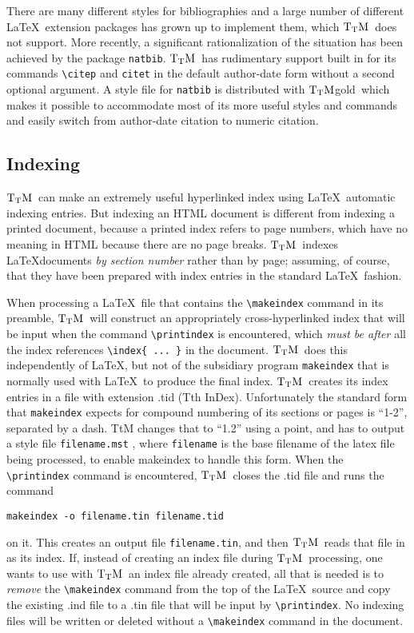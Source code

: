 \documentclass[12pt]{article}
\def\TtM{$\rm{}T_TH$}
\def\TtM{$\rm{}T_TM$}%
\def\TtMgold{\TtM{}gold}
\begin{document}
There are many different styles for bibliographies and a large number
of different \LaTeX\ extension packages has grown up to implement
them, which \TtM\ does not support. More recently, a significant
rationalization of the situation has been achieved by the package
\verb|natbib|.  \TtM\ has rudimentary support built in for its
commands \verb|\citep| and \verb|citet| in the default author-date
form without a second optional argument.  A style file for
\verb|natbib| is distributed with \TtMgold\ which makes it possible to
accommodate most of its more useful styles and commands and easily switch from
author-date citation to numeric citation.

\subsection{Indexing}

\TtM\ can make an extremely useful hyperlinked index using \LaTeX\
automatic indexing entries.  But indexing an HTML document is different
from indexing a printed document, because a printed index refers to
page numbers, which have no meaning in HTML because there are no page
breaks. \TtM\ indexes \LaTeX documents {\em by section number} rather
than by page; assuming, of course, that they have been prepared with
index entries in the standard \LaTeX\ fashion.

 When processing a \LaTeX\ file that contains the
\verb+\makeindex+ command in its preamble, \TtM\ will construct an
appropriately cross-hyperlinked index that will be input when the
command \verb+\printindex+ is encountered, which {\em must be after}
all the index references \verb+\index{ ... }+ in the document. \TtM\
does this independently of \LaTeX, but not of the subsidiary program
\verb+makeindex+ that is normally used with \LaTeX\ to produce the
final index. \TtM\ creates its index entries in a file with extension
.tid (Tth InDex). Unfortunately the standard form that
\verb+makeindex+ expects for compound numbering of its sections or
pages is ``1-2'', separated by a dash. TtM changes that to ``1.2''
using a point, and has to output a style file \verb+filename.mst+ ,
where \verb+filename+ is the base filename of the latex file being
processed, to enable makeindex to handle this form.  When the
\verb+\printindex+ command is encountered, \TtM\ closes the .tid file and
runs the command
\begin{verbatim}
makeindex -o filename.tin filename.tid
\end{verbatim}
on it.  This creates an output file \verb+filename.tin+, and
then \TtM\ reads that file in as its index.  If, instead of creating
an index file during \TtM\ processing, one wants to use with \TtM\ an
index file already created, all that is needed is to {\em remove} the
\verb+\makeindex+ command from the top of the \LaTeX\ source and copy
the existing .ind file to a .tin file that will be input by
\verb+\printindex+. No indexing files will be written or deleted
without a \verb+\makeindex+ command in the document.
\end{document}

